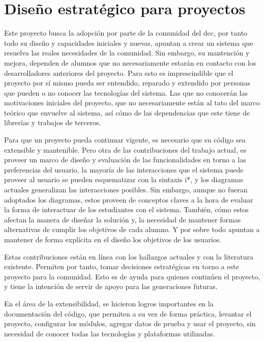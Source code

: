 \section{Diseño estratégico para proyectos}
    \par Este proyecto busca la adopción por parte de la comunidad del \acrshort{dcc}, por tanto todo su diseño y capacidades iniciales y nuevas, apuntan a crear un sistema que resuelva las reales necesidades de la comunidad. Sin embargo, su mantención y mejora, dependen de alumnos que no necesariamente estarán en contacto con los desarrolladores anteriores del proyecto. Para esto es imprescindible que el proyecto por sí mismo pueda ser entendido, reparado y extendido por personas que pueden o no conocer las tecnologías del sistema. Las que no conocerán las motivaciones iniciales del proyecto, que no necesariamente están al tato del marco teórico que envuelve al sistema, así cómo de las dependencias que este tiene de librerías y trabajos de terceros.
    \par Para que un proyecto pueda continuar vigente, es necesario que su código sea extensible y mantenible. Pero otra de las contribuciones del trabajo actual, es proveer un marco de diseño y evaluación de las funcionalidades en torno a las preferencias del usuario, la mayoría de las interacciones que el sistema puede proveer al usuario se pueden esquematizar con la sintaxis \gls{i*}, y los diagramas actuales generalizan las interacciones posibles. Sin embargo, aunque no fueran adoptados los diagramas, estos proveen de conceptos claves a la hora de evaluar la forma de interactuar de los estudiantes con el sistema. También, cómo estos afectan la manera de diseñar la solución y, la necesidad de mantener formas alternativas de cumplir los objetivos de cada alumno. Y por sobre todo apuntan a mantener de forma explícita en el diseño los objetivos de los usuarios.
    \par Estas contribuciones están en línea con los hallazgos actuales y con la literatura existente. Permiten por tanto, tomar decisiones estratégicas en torno a este proyecto para la comunidad. Esto es de ayuda para quienes continúen el proyecto, y tiene la intención de servir de apoyo para las generaciones futuras.
    \par En el área de la extensibilidad, se hicieron logros importantes en la documentación del código, que permiten a su vez de forma práctica, levantar el proyecto, configurar los módulos, agregar datos de prueba y usar el proyecto, sin necesidad de conocer todas las tecnologías y plataformas utilizadas.

